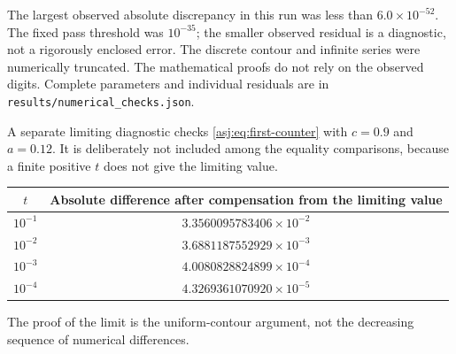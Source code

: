 \documentclass[11pt]{article}
\numberwithin{equation}{section}
\theoremstyle{definition}\newtheorem{definition}[theorem]{Definition}
\theoremstyle{remark}\newtheorem{remark}[theorem]{Remark}\newtheorem{example}[theorem]{Example}
\begin{document}
The largest observed absolute discrepancy in this run was less than
$6.0\times10^{-52}$. The fixed pass threshold was $10^{-35}$; the
smaller observed residual is a diagnostic, not a rigorously enclosed
error. The discrete contour and infinite series were numerically
truncated. The mathematical proofs do not rely on the observed digits.
Complete parameters and individual residuals are in
\texttt{results/numerical\_checks.json}.

A separate limiting diagnostic checks \eqref{asj:eq:first-counter} with
$c=0.9$ and $a=0.12$. It is deliberately not included among the equality
comparisons, because a finite positive $t$ does not give the limiting value.
\begin{center}
\begin{tabular}{@{}cc@{}}\toprule
$t$ & Absolute difference after compensation from the limiting value\\\midrule
$10^{-1}$ & $3.3560095783406\times10^{-2}$\\
$10^{-2}$ & $3.6881187552929\times10^{-3}$\\
$10^{-3}$ & $4.0080828824899\times10^{-4}$\\
$10^{-4}$ & $4.3269361070920\times10^{-5}$\\\bottomrule
\end{tabular}
\end{center}
The proof of the limit is the uniform-contour argument, not the decreasing
sequence of numerical differences.
\end{document}
